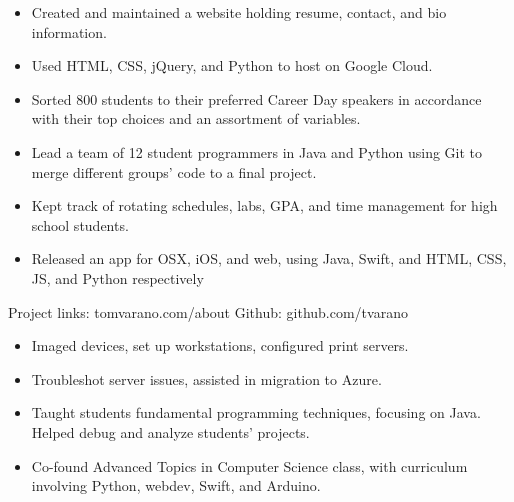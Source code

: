 \documentclass[11pt]{article}
\begin{document}
\vspace{2mm}
{\fontsize{10}{12}\robotocondlight
\begin{itemize}[noitemsep,nolistsep]
    \item Created and maintained a website holding resume, contact, and bio information.
    \item Used {\robotocond HTML}, {\robotocond CSS}, {\robotocond jQuery}, and {\robotocond Python} to host on {\robotocond Google Cloud}.
\end{itemize}
\begin{itemize}[noitemsep,nolistsep]
    \item Sorted 800 students to their preferred Career Day speakers in accordance with their top choices and an assortment of variables.
    \item Lead a team of 12 student programmers in {\robotocond Java} and {\robotocond Python} using {\robotocond Git} to merge different groups’ code to a final project.
\end{itemize}
\begin{itemize}[noitemsep,nolistsep]
    \item Kept track of rotating schedules, labs, GPA, and time management for high school students. 
    \item Released an app for OSX, iOS, and web, using {\robotocond Java}, {\robotocond Swift},
     and {\robotocond HTML}, {\robotocond CSS}, {\robotocond JS}, and {\robotocond Python} respectively
\end{itemize}
{\fontsize{8}{10}\robotocondlight Project links: tomvarano.com/about \hfill Github: github.com/tvarano
}
\vspace{-5mm}
\hsep
\vspace{-3mm}

\vspace{2mm}
{\fontsize{10}{12}\robotocondlight
    \begin{itemize}[noitemsep,nolistsep]
        \item Imaged devices, set up workstations, configured print servers. 
        \item Troubleshot server issues, assisted in migration to Azure. 
    \end{itemize}
    \vspace{3mm}
    \begin{itemize}[noitemsep,nolistsep]
        \item Taught students fundamental programming techniques, focusing on Java. Helped debug and analyze students’ projects. 
        \item Co-found Advanced Topics in Computer Science class, with curriculum involving Python, webdev, Swift, and Arduino. 
    \end{itemize}
    \vspace{3mm}

}}
\end{document}
